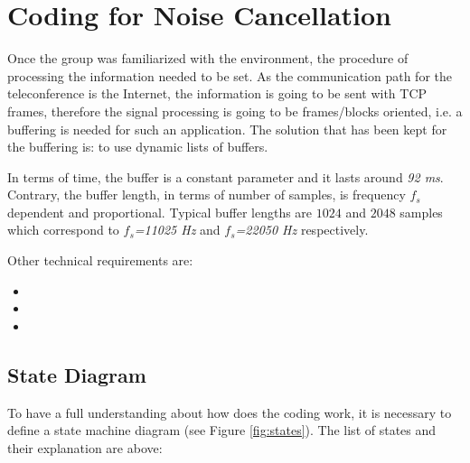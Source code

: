 \documentclass[11pt,a4paper,english]{book}  %
\theoremstyle{definition}  %
\theoremstyle{plain}  %
\theoremstyle{remark}  %
\begin{document}
\section{Coding for Noise Cancellation}
\label{sec:coding}

Once the group was familiarized with the environment, the procedure of processing the information needed to be set. As the communication path for the teleconference is the Internet, the information is going to be sent with TCP frames, therefore the signal processing is going to be frames/blocks oriented, i.e. a buffering is needed for such an application. The solution that has been kept for the buffering is: to use dynamic lists of buffers.

In terms of time, the buffer is a constant parameter and it lasts around \textit{92 ms}. Contrary, the buffer length, in terms of number of samples, is frequency $f_{s}$ dependent and proportional. Typical buffer lengths are $1024$ and $2048$ samples which correspond to \textit{$f_{s}$=11025 Hz} and \textit{$f_{s}$=22050 Hz} respectively.

Other technical requirements are:

\begin{itemize}
\item
\item
\item
\end{itemize}


	\subsection{State Diagram}
	
	To have a full understanding about how does the coding work, it is necessary to define a state machine diagram (see Figure \ref{fig:states}). The list of states and their explanation are above:
	
\end{document}
